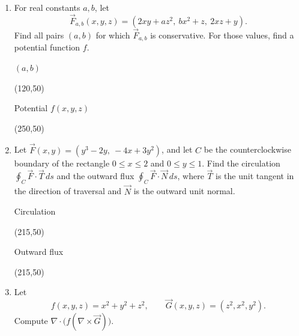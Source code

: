 \documentclass[12pt]{exam}
\begin{document}
\begin{enumerate}

\item For real constants $a,b$, let
\[
  \vec F_{a,b}(x,y,z)=(2xy+az^2,\ bx^2+z,\ 2xz+y).
\]
Find all pairs $(a,b)$ for which $\vec F_{a,b}$ is conservative.
For those values, find a potential function $f$.

\vfill
\begin{flushright}
\begin{minipage}{0.29\linewidth}
\centering
$(a,b)$\par\smallskip
\framebox(120,50){}
\end{minipage}\hspace{0.4cm}
\begin{minipage}{0.54\linewidth}
\centering
Potential $f(x,y,z)$\par\smallskip
\framebox(250,50){}
\end{minipage}
\end{flushright}

\item Let $\vec F(x,y)=(y^3-2y,\ -4x+3y^2)$, and let $C$ be the
counterclockwise boundary of the rectangle \mbox{$0\leq x\leq2$} and
\mbox{$0\leq y\leq1$}. Find the circulation
$\displaystyle\oint_C\vec F\cdot\vec T\,ds$ and the outward flux
$\displaystyle\oint_C\vec F\cdot\vec N\,ds$, where $\vec T$ is the
unit tangent in the direction of traversal and $\vec N$ is the outward
unit normal.

\vfill
\begin{flushright}
\begin{minipage}{0.46\linewidth}
\centering
Circulation\par\smallskip
\framebox(215,50){}
\end{minipage}\hspace{0.4cm}
\begin{minipage}{0.46\linewidth}
\centering
Outward flux\par\smallskip
\framebox(215,50){}
\end{minipage}
\end{flushright}

\newpage

\item Let
\[
  f(x,y,z)=x^2+y^2+z^2,\qquad \vec G(x,y,z)=(z^2,x^2,y^2).
\]
Compute $\displaystyle\nabla\cdot\bigl(f(\nabla\times\vec G)\bigr)$.


\end{enumerate}
\end{document}
